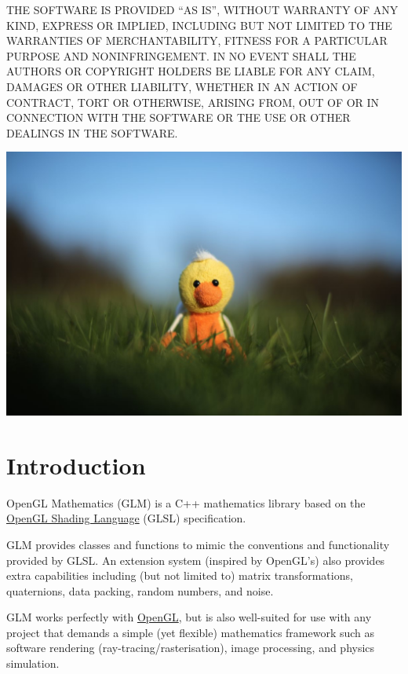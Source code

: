 \documentclass{scrartcl}
\numberwithin{figure}{subsection}
\begin{document}
THE SOFTWARE IS PROVIDED \enquote{AS IS}, WITHOUT WARRANTY OF ANY KIND, EXPRESS OR IMPLIED, INCLUDING BUT NOT LIMITED TO THE WARRANTIES OF MERCHANTABILITY, FITNESS FOR A PARTICULAR PURPOSE AND NONINFRINGEMENT. IN NO EVENT SHALL THE AUTHORS OR COPYRIGHT HOLDERS BE LIABLE FOR ANY CLAIM, DAMAGES OR OTHER LIABILITY, WHETHER IN AN ACTION OF CONTRACT, TORT OR OTHERWISE, ARISING FROM, OUT OF OR IN CONNECTION WITH THE SOFTWARE OR THE USE OR OTHER DEALINGS IN THE SOFTWARE.

\begin{center}
    \includegraphics[width=\textwidth]{duck-large2}
\end{center}

\pagebreak{}

\tableofcontents{}

\newpage{}

\section*{Introduction}

OpenGL Mathematics (GLM) is a C++ mathematics library based on the \href{https://www.opengl.org/documentation/glsl/}{OpenGL Shading Language} (GLSL) specification.

GLM provides classes and functions to mimic the conventions and functionality provided by GLSL.  An extension system (inspired by OpenGL's) also provides extra capabilities including (but not limited to) matrix transformations, quaternions, data packing, random numbers, and noise.

GLM works perfectly with \href{http://www.opengl.org}{OpenGL}, but is also well-suited for use with any project that demands a simple (yet flexible) mathematics framework such as software rendering (ray-tracing/rasterisation), image processing, and physics simulation.
\end{document}
